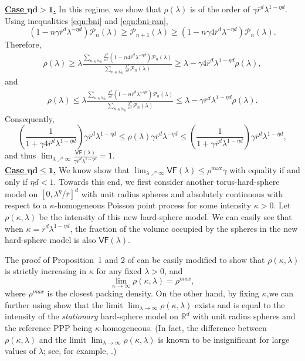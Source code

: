 \documentclass[11pt]{article}
\newcommand{\rbdd}{\overline{r}}
\newcommand{\reals}{\mathbb{R}}
\newcommand{\mbb}{\mathbb}
\newcommand{\lt}{\left}
\newcommand{\rt}{\right}
\begin{document}
\begin{appendices}
\noindent
\underline{\bf Case $\boldsymbol{\eta d >1}$.} In this regime, we show that  $\rho(\lambda)$ is of the order of $\gamma \rbdd^d \lambda^{1 - \eta d}$.
Using inequalities \eqref{eqn:bni} and \eqref{eqn:bni-ran},
\[
\lt(1 - n \gamma \rbdd^d \lambda^{-\eta d}\rt) \mathcal{P}_{n}(\lambda) \geq \mathcal{P}_{n+1}(\lambda) \geq \lt(1 - n \gamma 4\rbdd^d\lambda^{-\eta d}\rt) \mathcal{P}_{n}(\lambda).
\]
Therefore,
\begin{align*}
\rho(\lambda) \geq  \lambda \frac{\sum_{n \in \mbb{N}_0} \frac{\lambda^n}{n!}\lt(1 - n  4\rbdd^d\lambda^{-\eta d}\rt) \mathcal{P}_{n}(\lambda) }{\sum_{n \in \mbb{N}_0} \frac{\lambda^n}{n!} \mathcal{P}_{n}(\lambda)} \geq \lambda - \gamma 4\rbdd^d \lambda^{1 - \eta d} \rho(\lambda),
\end{align*}
and 
\begin{align*}
\rho(\lambda) \leq  \lambda \frac{\sum_{n \in \mbb{N}_0} \frac{\lambda^n}{n!}\lt(1 - n \rbdd^d\lambda^{-\eta d}\rt) \mathcal{P}_{n}(\lambda) }{\sum_{n \in \mbb{N}_0} \frac{\lambda^n}{n!} \mathcal{P}_{n}(\lambda)} \leq \lambda - \gamma \rbdd^d \lambda^{1 - \eta d}  \rho(\lambda).
\end{align*}
Consequently, 
\[
\lt(\frac{1}{ 1 + \gamma 4\rbdd^d \lambda^{1 - \eta d}} \rt) \gamma \rbdd^d \lambda^{1- \eta d} \leq \rho(\lambda)\gamma \rbdd^d \lambda^{- \eta d} \leq \lt(\frac{1}{ 1 + \gamma \rbdd^d \lambda^{1 - \eta d}} \rt) \gamma \rbdd^d \lambda^{1- \eta d},
\]
and thus  $\lim_{\lambda \nearrow \infty} \frac{\mathsf{VF}(\lambda)}{\gamma \rbdd^d \lambda^{1 - \eta d}} = 1$.\\

\noindent
\underline{\bf Case $\boldsymbol{\eta d \leq 1}$.}  We know show that $\lim_{\lambda \nearrow \infty} \mathsf{VF}(\lambda) \leq \rho^{\max} \gamma$ with equality if and only if $\eta d < 1$. Towards this end, we first consider another torus-hard-sphere model on $[0, \lambda^\eta/\rbdd]^d$ with unit radius spheres  and  absolutely continuous  with respect to a $\kappa$-homogeneous Poisson point process for some intensity $\kappa > 0$. Let  $\rho(\kappa, \lambda)$ be the intensity of this new hard-sphere model. We can easily see that when $\kappa = \rbdd^d \lambda^{1-  \eta d}$, the fraction of the volume occupied by the spheres in the new hard-sphere model is also $ \mathsf{VF}(\lambda)$.

The proof of Proposition~1 and 2 of \cite{MMSWD01} can be easily modified to show that  $\rho(\kappa, \lambda)$ is strictly increasing in $\kappa$ for any fixed $\lambda > 0$, and
\[
\lim_{\kappa \to \infty} \rho(\kappa, \lambda) = \rho^{max}, 
\]
where $\rho^{max}$ is the closest packing density.
On the other hand, by fixing $\kappa$,we can further using \cite{MMSWD01} show that the limit $\lim_{\lambda \to \infty} \rho(\kappa, \lambda)$ exists and is equal to the intensity of the {\em stationary} hard-sphere model on $\reals^d$ with unit radius spheres and the reference PPP being $\kappa$-homogeneous. (In fact, the difference between $\rho(\kappa, \lambda)$ and the limit $\lim_{\lambda \to \infty} \rho(\kappa, \lambda)$ is known to be insignificant for large values of $\lambda$; see, for example, \cite{BN12}.) 


\end{appendices}
\end{document}

